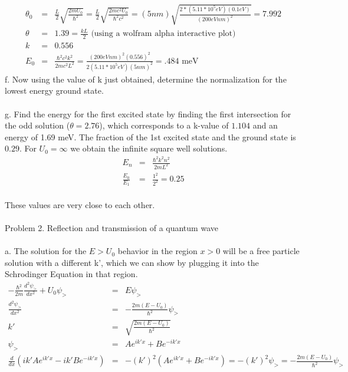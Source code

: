 \documentclass[11pt]{amsart}
\begin{document}
\begin{eqnarray*} 
\theta_{0} &=& \frac{L}{2}\sqrt{\frac{2mU_{0}}{\hbar^{2}}} = \frac{L}{2}\sqrt{\frac{2mc^{2}U_{0}}{\hbar^{2}c^{2}}} = (5nm)\sqrt{\frac{2*(5.11*10^{5}eV)(0.1eV)}{(200eVnm)^{2}}} =7.992 \\
\theta &=& 1.39 = \frac{kL}{2} \mbox{ (using a wolfram alpha interactive plot)} \\
k &=& 0.556 \\
E_{0} &=& \frac{\hbar^{2}c^{2}k^{2}}{2mc^{2}L^{2}} = \frac{(200eVnm)^{2}(0.556)^{2}}{2(5.11*10^{5}eV)(5nm)^{2}} = .484 \mbox{ meV} 
\end{eqnarray*} 
f.  Now using the value of k just obtained, determine the normalization for the lowest energy ground state. \\ \\
g. Find the energy for the first excited state by finding the first intersection for the odd solution ($\theta=2.76$), which corresponds to a k-value of $1.104$ and an energy of  1.69 meV. The fraction of the 1st excited state and the ground state is $0.29$. For $U_{0}=\infty$ we obtain the infinite square well solutions. \\
\begin{eqnarray*} 
E_{n} &=& \frac{\hbar^{2}k^{2}n^{2}}{2mL^{2}} \\
\frac{E_{0}}{E_{1}} &=& \frac{1^{2}}{2^{2}} = 0.25 
\end{eqnarray*} \\
These values are very close to each other. \\ \\
Problem 2. Reflection and transmission of a quantum wave \\ \\
a. The solution for the $E>U_{0}$ behavior in the region $x>0$ will be a free particle solution with a different k', which we can show by plugging it into the Schrodinger Equation in that region. \\
\begin{eqnarray*}
-\frac{\hbar^{2}}{2m}\frac{d^{2}\psi_{>}}{dx^{2}}+U_{0}\psi_{>} &=& E\psi_{>} \\
\frac{d^{2}\psi_{>}}{dx^{2}} &=& -\frac{2m(E-U_{0})}{\hbar^{2}}\psi_{>} \\
k' &=& \sqrt{\frac{2m(E-U_{0})}{\hbar^{2}}} \\
\psi_{>} &=& Ae^{ik'x}+Be^{-ik'x} \\
\frac{d}{dx}(ik'Ae^{ik'x}-ik'Be^{-ik'x}) &=& -(k')^{2}(Ae^{ik'x}+Be^{-ik'x}) = -(k')^{2}\psi_{>} =-\frac{2m(E-U_{0})}{\hbar^{2}}\psi_{>}
\end{eqnarray*} \\ 
\end{document}
